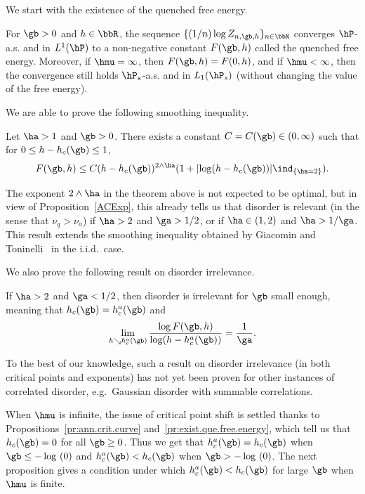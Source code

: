 We start with the existence of the quenched free energy.

\begin{prop}\label{pr:exist.que.free.energy}
For $\gb > 0$ and $h \in \bbR$, the sequence $\{(1/n) \log Z_{n,\gb,h}\}_{n \in \bbN}$ converges $\hP$-a.s. and in $L^1(\hP)$ to a non-negative constant $F(\gb,h)$ called the quenched free energy. Moreover, if $\hmu = \infty$, then $F(\gb,h) = F(0,h)$, and if $\hmu < \infty$, then the convergence still holds $\hP_s$-a.s. and in $L_1(\hP_s)$ (without changing the value of the free energy).
\end{prop}

We are able to prove the following smoothing inequality.

\begin{theo}\label{thm:smoothing}
Let $\ha > 1$ and $\gb > 0$. There exists a constant $C = C(\gb) \in (0,\infty)$ such that for $0 \leq h - h_c(\gb) \leq 1$,
\begin{equation}
F(\gb,h) \leq C (h - h_c(\gb))^{2 \wedge \ha}{(1 + |{\log (h - h_c(\gb))}| \ind_{\{\ha = 2\}})}.
\end{equation}
\end{theo}

The exponent $2 \wedge \ha$ in the theorem above is not expected to be optimal, but in view of Proposition~\ref{ACExp}, this already tells us that disorder is relevant (in the sense that $\nu_q > \nu_a$) if $\ha > 2$ and $\ga > 1/2$, or if $\ha \in (1,2)$ and $\ha > 1/\ga$. This result extends the smoothing inequality obtained by Giacomin and Toninelli~\cite{GiT2006} in the i.i.d.~case.

We also prove the following result on disorder irrelevance.

\begin{theo}\label{thm:irrelevance}
If $\ha > 2$ and $\ga < 1/2$, then disorder is irrelevant for $\gb$ small enough, meaning that $h_c(\gb) = h_c^a(\gb)$ and
\begin{equation}
\lim_{h \searrow h_c^a(\gb)} \frac{\log F(\gb,h)}{\log (h - h_c^a(\gb))} = \frac{1}{\ga}.
\end{equation}
\end{theo}

To the best of our knowledge, such a result on disorder irrelevance (in both critical points and exponents) has not yet been proven for other instances of correlated disorder, e.g.~Gaussian disorder with summable correlations.

When $\hmu$ is infinite, the issue of critical point shift is settled thanks to Prop\-os\-itions~\ref{pr:ann.crit.curve} and~\ref{pr:exist.que.free.energy}, which tell us that $h_c(\gb) = 0$ for all $\gb \geq 0$. Thus we get that $h_c^a(\gb) = h_c(\gb)$ when $\gb \le - \log~(0)$ and $h_c^a(\gb) < h_c(\gb)$ when $\gb > - \log~(0)$. The next proposition gives a condition under which $h_c^a(\gb) < h_c(\gb)$ for large $\gb$ when $\hmu$ is finite.

